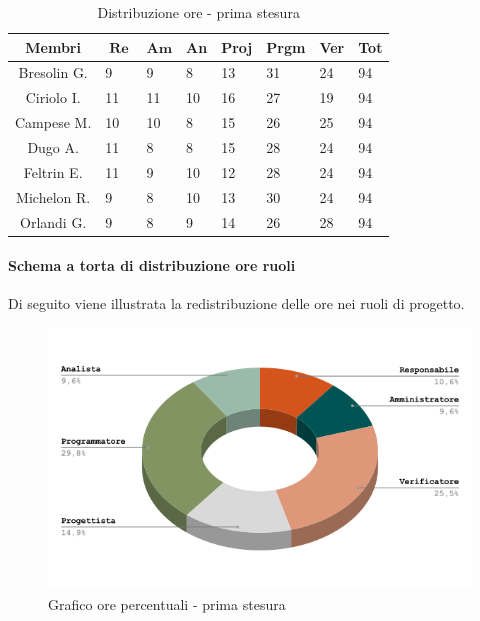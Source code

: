 \documentclass[10pt, a4paper]{article}
\begin{document}
{{{{{{{\renewcommand{\arraystretch}{1.2}
\begin{table}[H]
\begin{tabularx}{\textwidth}{c|X|X|X|X|X|X|X}
        \textbf{Membri} & $\operatorname{\textbf{Re}}$ & $\mathrm{\textbf{Am}}$ & \textbf{An} & \textbf{Proj} & \textbf{Prgm} & \textbf{Ver} & \textbf{Tot} \\
        \hline Bresolin G. & 9 & 9 & 8 & 13 & 31 & 24 & 94 \\
        \hline Ciriolo I. & 11 & 11 & 10 & 16 & 27 & 19 & 94 \\
        \hline Campese M. & 10 & 10 & 8 & 15 & 26 & 25 & 94 \\
        \hline Dugo A. & 11 & 8 & 8 & 15 & 28 & 24 & 94 \\
        \hline Feltrin E. & 11 & 9 & 10 & 12 & 28 & 24 & 94 \\
        \hline Michelon R. & 9 & 8 & 10 & 13 & 30 & 24 & 94 \\
        \hline Orlandi G. & 9 & 8 & 9 & 14 & 26 & 28 & 94 
    \end{tabularx}
    \caption{Distribuzione ore - prima stesura}
    \end{table}

\paragraph{Schema a torta di distribuzione ore ruoli} Di seguito viene illustrata la redistribuzione delle ore nei ruoli di progetto.
    \begin{figure}[H]
        \centering               
        \includegraphics[width=14cm]{torta.png}
         \caption{Grafico ore percentuali - prima stesura}
    \end{figure}

}}}}}}}
\end{document}
